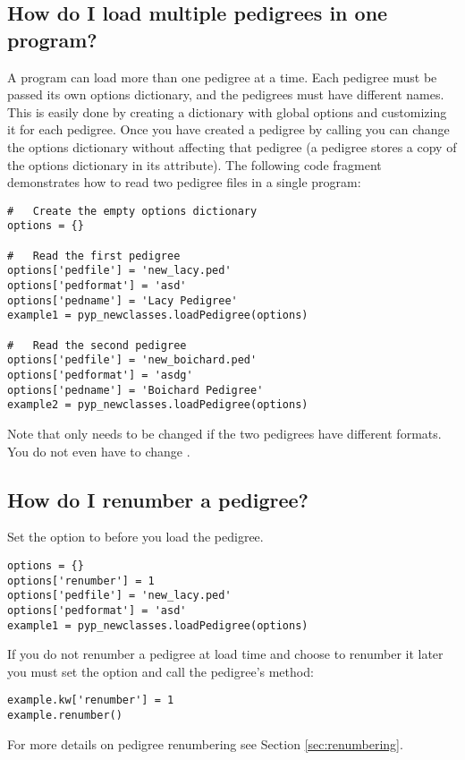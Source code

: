 \subsection{How do I load multiple pedigrees in one program?}
\label{sec:howto-load-multiple-pedigrees}
A \PyPedal{} program can load more than one pedigree at a time.  Each pedigree must be passed its own options dictionary, and the pedigrees must have different names.  This is easily done by creating a dictionary with global options and customizing it for each pedigree.  Once you have created a pedigree by calling  you can change the options dictionary without affecting that pedigree (a pedigree stores a copy of the options dictionary in its  attribute).  The following code fragment demonstrates how to read two pedigree files in a single program:
\begin{verbatim}
#   Create the empty options dictionary
options = {}

#   Read the first pedigree
options['pedfile'] = 'new_lacy.ped'
options['pedformat'] = 'asd'
options['pedname'] = 'Lacy Pedigree'
example1 = pyp_newclasses.loadPedigree(options)

#   Read the second pedigree
options['pedfile'] = 'new_boichard.ped'
options['pedformat'] = 'asdg'
options['pedname'] = 'Boichard Pedigree'
example2 = pyp_newclasses.loadPedigree(options)
\end{verbatim}
Note that  only needs to be changed if the two pedigrees have different formats.  You do not even have to change .

\subsection{How do I renumber a pedigree?}
\label{sec:howto-renumber-pedigree}
Set the  option to  before you load the pedigree.
\begin{verbatim}
options = {}
options['renumber'] = 1
options['pedfile'] = 'new_lacy.ped'
options['pedformat'] = 'asd'
example1 = pyp_newclasses.loadPedigree(options)
\end{verbatim}
If you do not renumber a pedigree at load time and choose to renumber it later you must set the  option and call the pedigree's  method:
\begin{verbatim}
example.kw['renumber'] = 1
example.renumber()
\end{verbatim}
For more details on pedigree renumbering see Section \ref{sec:renumbering}.

